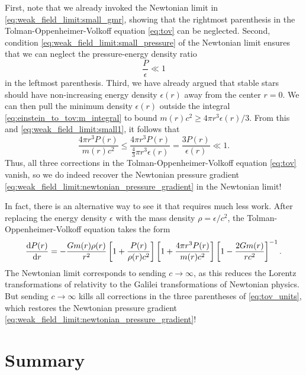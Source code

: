 First, note that we already invoked the Newtonian limit in \cref{eq:weak_field_limit:small_gmr}, showing that the rightmost parenthesis in the Tolman-Oppenheimer-Volkoff equation \eqref{eq:tov} can be neglected.
Second, condition \eqref{eq:weak_field_limit:small_pressure} of the Newtonian limit ensures that we can neglect the pressure-energy density ratio
\begin{equation}
	\frac{P}{\epsilon} \ll 1
	\label{eq:weak_field_limit:small1}
\end{equation}
in the leftmost parenthesis.
Third, we have already argued that stable stars should have non-increasing energy density $\epsilon(r)$ away from the center $r=0$.
We can then pull the minimum density $\epsilon(r)$ outside the integral \eqref{eq:einstein_to_tov:m_integral} to bound $m(r) c^2 \geq 4 \pi r^3 \epsilon(r) / 3$.
From this and \cref{eq:weak_field_limit:small1}, it follows that
\begin{equation}
	\frac{4 \pi r^3 P(r)}{m(r) c^2} \leq \frac{4 \pi r^3 P(r)}{\frac{4}{3} \pi r^3 \epsilon(r)}
	                                =    \frac{3 P(r)}{\epsilon(r)}
						            \ll  1 .
	\label{eq:weak_field_limit:small2}
\end{equation}
Thus, all three corrections in the Tolman-Oppenheimer-Volkoff equation \eqref{eq:tov} vanish, so we do indeed recover the Newtonian pressure gradient \eqref{eq:weak_field_limit:newtonian_pressure_gradient} in the Newtonian limit!

In fact, there is an alternative way to see it that requires much less work.
After replacing the energy density $\epsilon$ with the mass density $\rho = \epsilon / c^2$, the Tolman-Oppenheimer-Volkoff equation takes the form
\begin{equation}
	\odv{P(r)}{r} = -\frac{G m(r) \rho(r)}{r^2} \left[ 1 + \frac{P(r)}{\rho(r) c^2} \right] \left[ 1 + \frac{4 \pi r^3 P(r)}{m(r) c^2} \right] \left[ 1 - \frac{2 G m(r)}{r c^2} \right]^{-1} .
	\label{eq:tov_units}
\end{equation}
The Newtonian limit corresponds to sending $c \rightarrow \infty$, as this reduces the Lorentz transformations of relativity to the Galilei transformations of Newtonian physics.
But sending $c \rightarrow \infty$ kills all corrections in the three parentheses of \cref{eq:tov_units}, which restores the Newtonian pressure gradient \eqref{eq:weak_field_limit:newtonian_pressure_gradient}!


\section{Summary}


